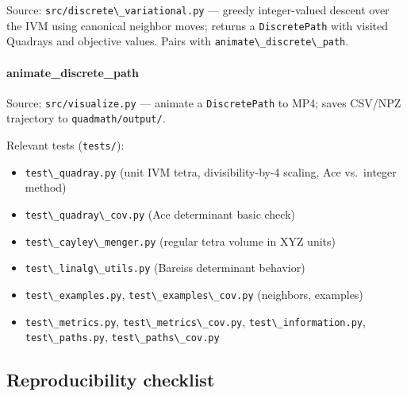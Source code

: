 \documentclass[
  10pt,
]{article}
\newcommand{\passthrough}[1]{#1}
\providecommand{\tightlist}{%
  \setlength{\itemsep}{0pt}\setlength{\parskip}{0pt}}
\renewcommand{\texttt}[1]{%
    \colorbox{codebg}{\color{codefg}\ttfamily #1}%
}
\begin{document}
Source: \passthrough{\lstinline!src/discrete\_variational.py!} ---
greedy integer-valued descent over the IVM using canonical neighbor
moves; returns a \passthrough{\lstinline!DiscretePath!} with visited
Quadrays and objective values. Pairs with
\passthrough{\lstinline!animate\_discrete\_path!}.

\hypertarget{code:animate_discrete_path}{%
\paragraph{\texorpdfstring{\texttt{animate\_discrete\_path}}{animate\_discrete\_path}}\label{code:animate_discrete_path}}

Source: \passthrough{\lstinline!src/visualize.py!} --- animate a
\passthrough{\lstinline!DiscretePath!} to MP4; saves CSV/NPZ trajectory
to \passthrough{\lstinline!quadmath/output/!}.

Relevant tests (\passthrough{\lstinline!tests/!}):

\begin{itemize}
\tightlist
\item
  \passthrough{\lstinline!test\_quadray.py!} (unit IVM tetra,
  divisibility-by-4 scaling, Ace vs.~integer method)
\item
  \passthrough{\lstinline!test\_quadray\_cov.py!} (Ace determinant basic
  check)
\item
  \passthrough{\lstinline!test\_cayley\_menger.py!} (regular tetra
  volume in XYZ units)
\item
  \passthrough{\lstinline!test\_linalg\_utils.py!} (Bareiss determinant
  behavior)
\item
  \passthrough{\lstinline!test\_examples.py!},
  \passthrough{\lstinline!test\_examples\_cov.py!} (neighbors, examples)
\item
  \passthrough{\lstinline!test\_metrics.py!},
  \passthrough{\lstinline!test\_metrics\_cov.py!},
  \passthrough{\lstinline!test\_information.py!},
  \passthrough{\lstinline!test\_paths.py!},
  \passthrough{\lstinline!test\_paths\_cov.py!}
\end{itemize}

\hypertarget{reproducibility-checklist}{%
\subsection{Reproducibility checklist}\label{reproducibility-checklist}}
\end{document}
